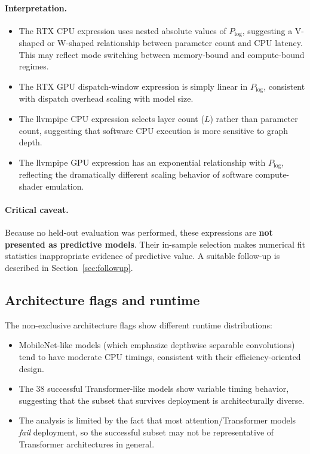\documentclass[10pt,twocolumn,letterpaper]{article}
\begin{document}
\paragraph{Interpretation.}
\begin{itemize}[nosep,leftmargin=*]
  \item The RTX CPU expression uses nested absolute values of $P_{\log}$, suggesting a V-shaped or W-shaped relationship between parameter count and CPU latency. This may reflect mode switching between memory-bound and compute-bound regimes.
  \item The RTX GPU dispatch-window expression is simply linear in $P_{\log}$, consistent with dispatch overhead scaling with model size.
  \item The llvmpipe CPU expression selects layer count ($L$) rather than parameter count, suggesting that software CPU execution is more sensitive to graph depth.
  \item The llvmpipe GPU expression has an exponential relationship with $P_{\log}$, reflecting the dramatically different scaling behavior of software compute-shader emulation.
\end{itemize}

\paragraph{Critical caveat.}
Because no held-out evaluation was performed, these expressions are \textbf{not presented as predictive models}. Their in-sample selection makes numerical fit statistics inappropriate evidence of predictive value. A suitable follow-up is described in Section~\ref{sec:followup}.

\subsection{Architecture flags and runtime}

The non-exclusive architecture flags show different runtime distributions:
\begin{itemize}[nosep,leftmargin=*]
  \item MobileNet-like models (which emphasize depthwise separable convolutions) tend to have moderate CPU timings, consistent with their efficiency-oriented design.
  \item The 38 successful Transformer-like models show variable timing behavior, suggesting that the subset that survives deployment is architecturally diverse.
  \item The analysis is limited by the fact that most attention/Transformer models \emph{fail} deployment, so the successful subset may not be representative of Transformer architectures in general.
\end{itemize}
\end{document}
